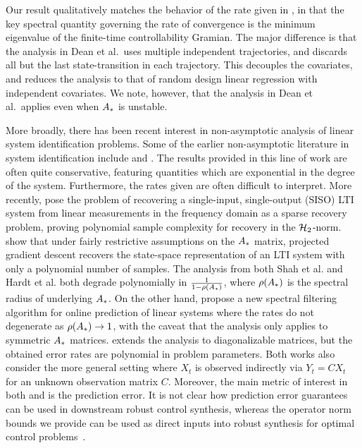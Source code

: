 Our result qualitatively matches the behavior of the
rate given in \cite{dean17},
in that the key spectral quantity governing the rate of convergence is the
minimum eigenvalue of the finite-time controllability Gramian.
The major difference is that the analysis
in Dean et al.\ uses multiple independent trajectories, and discards all but the last
state-transition in each trajectory. This decouples the covariates, and reduces
the analysis to that of random design linear regression with independent covariates.
We note, however, that the analysis in Dean et al.\ applies even when $A_{*}$ is
unstable.

More broadly, there has been recent interest in non-asymptotic analysis of linear system
identification problems. Some of the earlier non-asymptotic literature in system identification
include \cite{campi2002finite} and \cite{vidyasagar2008learning}.
The results provided in this line of work are often quite conservative,
featuring quantities which are exponential in the degree of the system.
Furthermore, the rates given are often difficult to interpret.
More recently, \cite{shah12} pose the problem of recovering
a single-input, single-output (SISO) LTI system from linear measurements in the frequency domain as a sparse recovery
problem, proving polynomial sample complexity for recovery in the $\mathcal{H}_2$-norm.
\cite{hardt16} show that under fairly restrictive assumptions on the
$A_{*}$ matrix, projected gradient descent recovers the state-space representation 
of an LTI system with only a polynomial number of samples. 
The analysis from both Shah et al. and Hardt et al. both degrade polynomially
in $\frac{1}{1-\rho(A_{*})}$, where $\rho(A_{*})$ is the spectral radius of underlying $A_{*}$.
%
On the other hand, \cite{hazan17} propose a new spectral filtering algorithm 
for online prediction of linear systems where the rates do not degenerate as $\rho(A_{*}) \to 1$,
with the caveat that the analysis only applies to symmetric $A_{*}$ matrices. \cite{hazan18} extends the analysis to diagonalizable matrices, but the obtained error rates are polynomial in problem parameters. Both works also consider the more general setting where $X_t$ is observed indirectly via $Y_t = CX_t$ for an unknown observation matrix $C$.
%
Moreover, the main metric of interest in both \cite{hardt16} and \cite{hazan17,hazan18}
is the prediction error.  It is not clear how
prediction error guarantees can be used in downstream robust control synthesis, 
whereas the operator norm bounds we provide can be used as direct
inputs into robust synthesis for optimal control problems~\citep{dean17}.


